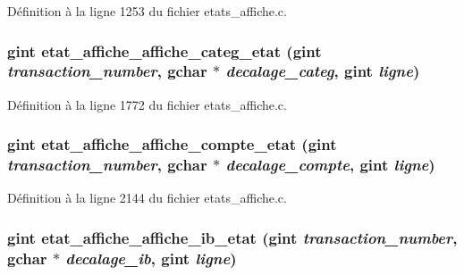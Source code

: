 Définition à la ligne 1253 du fichier etats\_\-affiche.c.

\subsubsection[{etat\_\-affiche\_\-affiche\_\-categ\_\-etat}]{\setlength{\rightskip}{0pt plus 5cm}gint etat\_\-affiche\_\-affiche\_\-categ\_\-etat (gint {\em transaction\_\-number}, \/  gchar $\ast$ {\em decalage\_\-categ}, \/  gint {\em ligne})}\label{etats__affiche_8c_a466c2f771970489a9816c9e11732f662}


Définition à la ligne 1772 du fichier etats\_\-affiche.c.

\subsubsection[{etat\_\-affiche\_\-affiche\_\-compte\_\-etat}]{\setlength{\rightskip}{0pt plus 5cm}gint etat\_\-affiche\_\-affiche\_\-compte\_\-etat (gint {\em transaction\_\-number}, \/  gchar $\ast$ {\em decalage\_\-compte}, \/  gint {\em ligne})}\label{etats__affiche_8c_af8b7ccec4ce47a0fc4f85b185900a665}


Définition à la ligne 2144 du fichier etats\_\-affiche.c.

\subsubsection[{etat\_\-affiche\_\-affiche\_\-ib\_\-etat}]{\setlength{\rightskip}{0pt plus 5cm}gint etat\_\-affiche\_\-affiche\_\-ib\_\-etat (gint {\em transaction\_\-number}, \/  gchar $\ast$ {\em decalage\_\-ib}, \/  gint {\em ligne})}\label{etats__affiche_8c_a644cc87f913a5116fdf64d41f52b366a}


